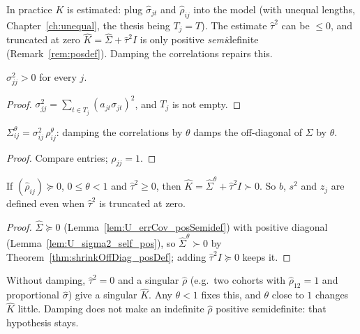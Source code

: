 In practice $K$ is estimated: plug $\hat\sigma_{jt}$ and $\hat\rho_{ij}$ into the
model (with unequal lengths, Chapter~\ref{ch:unequal}, the thesis being $T_j = T$).
The estimate $\hat\tau^2$ can be $\le 0$, and truncated at zero
$\hat K = \hat\Sigma + \hat\tau^2 I$ is only positive \emph{semi}definite
(Remark~\ref{rem:posdef}). Damping the correlations repairs this.

\begin{lemma}\label{lem:U_sigma2_self_pos}
  \leanok
  $\sigma^2_{jj} > 0$ for every $j$.
\end{lemma}
\begin{proof}
  \leanok
  $\sigma^2_{jj} = \sum_{t \in T_j} (a_{jt}\sigma_{jt})^2$, and $T_j$ is not empty.
\end{proof}

\begin{lemma}\label{lem:U_shrinkOffDiag_errCov}
  \leanok
  $\Sigma^\theta_{ij} = \sigma^2_{ij}\,\rho^\theta_{ij}$: damping the
  correlations by $\theta$ damps the off-diagonal of $\Sigma$ by $\theta$.
\end{lemma}
\begin{proof}
  \leanok
  Compare entries; $\rho_{jj} = 1$.
\end{proof}

\begin{theorem}\label{thm:U_dampedK_posDef}
  \leanok
  If $(\hat\rho_{ij}) \succeq 0$, $0 \le \theta < 1$ and $\hat\tau^2 \ge 0$, then
  $\hat K = \hat\Sigma^\theta + \hat\tau^2 I \succ 0$. So $b$, $s^2$ and $z_j$
  are defined even when $\hat\tau^2$ is truncated at zero.
\end{theorem}
\begin{proof}
  \leanok
  $\hat\Sigma \succeq 0$ (Lemma~\ref{lem:U_errCov_posSemidef}) with positive
  diagonal (Lemma~\ref{lem:U_sigma2_self_pos}), so
  $\hat\Sigma^\theta \succ 0$ by Theorem~\ref{thm:shrinkOffDiag_posDef};
  adding $\hat\tau^2 I \succeq 0$ keeps it.
\end{proof}

\begin{remark}\label{rem:damped_plugin}
  Without damping, $\hat\tau^2 = 0$ and a singular $\hat\rho$ (e.g.\ two
  cohorts with $\hat\rho_{12} = 1$ and proportional $\hat\sigma$) give a
  singular $\hat K$. Any $\theta < 1$ fixes this, and $\theta$ close to $1$
  changes $\hat K$ little. Damping does not make an indefinite $\hat\rho$
  positive semidefinite: that hypothesis stays.
\end{remark}
